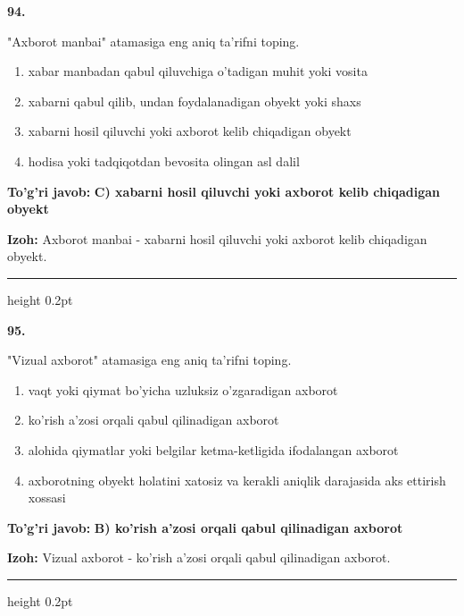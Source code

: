 \documentclass[10pt,a4paper,oneside]{article}
\begin{document}
\noindent\textbf{\color{ink}94.}
\par
"Axborot manbai" atamasiga eng aniq ta'rifni toping.
\begin{enumerate}[label=\Alph*),leftmargin=9mm]
\item xabar manbadan qabul qiluvchiga o'tadigan muhit yoki vosita
\item xabarni qabul qilib, undan foydalanadigan obyekt yoki shaxs
\item xabarni hosil qiluvchi yoki axborot kelib chiqadigan obyekt
\item hodisa yoki tadqiqotdan bevosita olingan asl dalil
\end{enumerate}
\begin{tcolorbox}[enhanced,breakable,colback=teal!4,colframe=teal!50!black,boxrule=0.5pt,arc=1.1mm,left=3mm,right=3mm,top=1.7mm,bottom=1.7mm,before skip=2mm,after skip=2mm]
\textbf{\color{teal}To'g'ri javob:} \textbf{C) xabarni hosil qiluvchi yoki axborot kelib chiqadigan obyekt}
\par\smallskip
\textbf{Izoh:} Axborot manbai - xabarni hosil qiluvchi yoki axborot kelib chiqadigan obyekt.
\end{tcolorbox}
\vspace{2mm}\hrule height 0.2pt \vspace{3mm}

\noindent\textbf{\color{ink}95.}
\par
"Vizual axborot" atamasiga eng aniq ta'rifni toping.
\begin{enumerate}[label=\Alph*),leftmargin=9mm]
\item vaqt yoki qiymat bo'yicha uzluksiz o'zgaradigan axborot
\item ko'rish a'zosi orqali qabul qilinadigan axborot
\item alohida qiymatlar yoki belgilar ketma-ketligida ifodalangan axborot
\item axborotning obyekt holatini xatosiz va kerakli aniqlik darajasida aks ettirish xossasi
\end{enumerate}
\begin{tcolorbox}[enhanced,breakable,colback=teal!4,colframe=teal!50!black,boxrule=0.5pt,arc=1.1mm,left=3mm,right=3mm,top=1.7mm,bottom=1.7mm,before skip=2mm,after skip=2mm]
\textbf{\color{teal}To'g'ri javob:} \textbf{B) ko'rish a'zosi orqali qabul qilinadigan axborot}
\par\smallskip
\textbf{Izoh:} Vizual axborot - ko'rish a'zosi orqali qabul qilinadigan axborot.
\end{tcolorbox}
\vspace{2mm}\hrule height 0.2pt \vspace{3mm}
\end{document}
